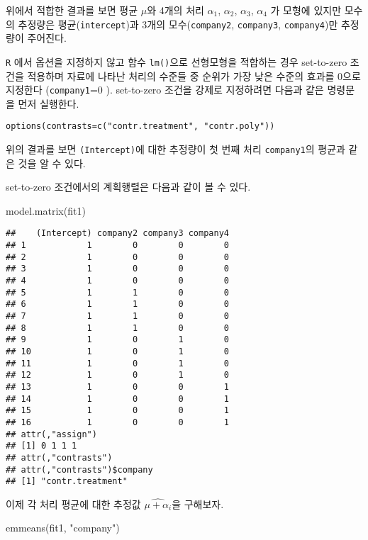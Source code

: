 \documentclass[
]{book}
\newenvironment{Shaded}{\begin{snugshade}}{\end{snugshade}}
\newcommand{\FunctionTok}[1]{\textcolor[rgb]{0.00,0.00,0.00}{#1}}
\newcommand{\NormalTok}[1]{#1}
\newcommand{\StringTok}[1]{\textcolor[rgb]{0.31,0.60,0.02}{#1}}
\begin{document}
위에서 적합한 결과를 보면 평균 \(\mu\)와 4개의 처리 \(\alpha_1\),
\(\alpha_2\), \(\alpha_3\), \(\alpha_4\) 가 모형에 있지만 모수의 추정량은
평균(\texttt{intercept})과 3개의 모수(\texttt{company2}, \texttt{company3}, \texttt{company4})만
추정량이 주어진다.

\texttt{R} 에서 옵션을 지정하지 않고 함수 \texttt{lm()}으로 선형모형을 적합하는 경우 set-to-zero 조건을
적용하며 자료에 나타난 처리의 수준들 중 순위가 가장 낮은 수준의 효과를
0으로 지정한다 (\texttt{company1}=0 ). set-to-zero 조건을 강제로 지정하려면 다음과 같은 명령문을 먼저 실행한다.

\begin{verbatim}
options(contrasts=c("contr.treatment", "contr.poly"))
\end{verbatim}

위의 결과를 보면 \texttt{(Intercept)}에 대한 추정량이 첫 번째 처리 \texttt{company1}의
평균과 같은 것을 알 수 있다.

set-to-zero 조건에서의 계획행렬은 다음과 같이 볼 수 있다.

\begin{Shaded}
\begin{Highlighting}[]
\FunctionTok{model.matrix}\NormalTok{(fit1)}
\end{Highlighting}
\end{Shaded}

\begin{verbatim}
##    (Intercept) company2 company3 company4
## 1            1        0        0        0
## 2            1        0        0        0
## 3            1        0        0        0
## 4            1        0        0        0
## 5            1        1        0        0
## 6            1        1        0        0
## 7            1        1        0        0
## 8            1        1        0        0
## 9            1        0        1        0
## 10           1        0        1        0
## 11           1        0        1        0
## 12           1        0        1        0
## 13           1        0        0        1
## 14           1        0        0        1
## 15           1        0        0        1
## 16           1        0        0        1
## attr(,"assign")
## [1] 0 1 1 1
## attr(,"contrasts")
## attr(,"contrasts")$company
## [1] "contr.treatment"
\end{verbatim}

이제 각 처리 평균에 대한 추정값 \(\widehat{\mu+ \alpha_i}\)을 구해보자.

\begin{Shaded}
\begin{Highlighting}[]
\FunctionTok{emmeans}\NormalTok{(fit1, }\StringTok{"company"}\NormalTok{)}
\end{Highlighting}
\end{Shaded}
\end{document}
